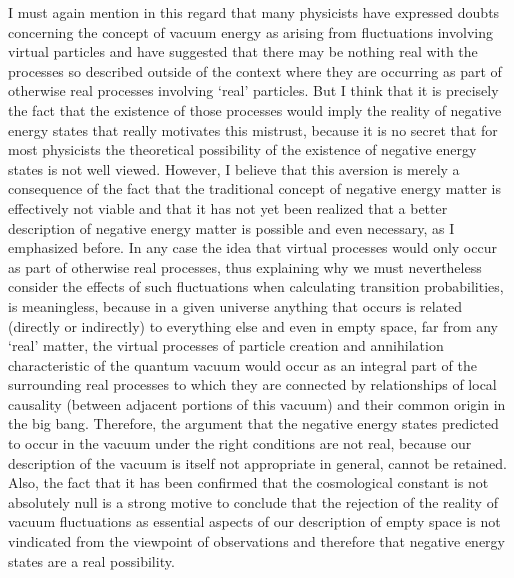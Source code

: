 \documentclass[notitlepage,12pt]{report}
\begin{document}
I must again mention in this regard that many physicists have expressed doubts concerning the concept of vacuum energy as arising from fluctuations involving virtual particles and have suggested that there may be nothing real with the processes so described outside of the context where they are occurring as part of otherwise real processes involving `real' particles. But I think that it is precisely the fact that the existence of those processes would imply the reality of negative energy states that really motivates this mistrust, because it is no secret that for most physicists the theoretical possibility of the existence of negative energy states is not well viewed. However, I believe that this aversion is merely a consequence of the fact that the traditional concept of negative energy matter is effectively not viable and that it has not yet been realized that a better description of negative energy matter is possible and even necessary, as I emphasized before. In any case the idea that virtual processes would only occur as part of otherwise real processes, thus explaining why we must nevertheless consider the effects of such fluctuations when calculating transition probabilities, is meaningless, because in a given universe anything that occurs is related (directly or indirectly) to everything else and even in empty space, far from any `real' matter, the virtual processes of particle creation and annihilation characteristic of the quantum vacuum would occur as an integral part of the surrounding real processes to which they are connected by relationships of local causality (between adjacent portions of this vacuum) and their common origin in the big bang. Therefore, the argument that the negative energy states predicted to occur in the vacuum under the right conditions are not real, because our description of the vacuum is itself not appropriate in general, cannot be retained. Also, the fact that it has been confirmed that the cosmological constant is not absolutely null is a strong motive to conclude that the rejection of the reality of vacuum fluctuations as essential aspects of our description of empty space is not vindicated from the viewpoint of observations and therefore that negative energy states are a real possibility.
\end{document}
